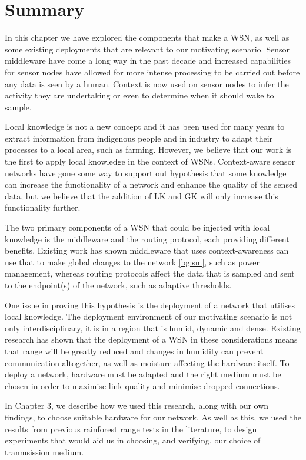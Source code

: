 
\section{Summary}
	In this chapter we have explored the components that make a WSN, as well as some existing deployments that are relevant to our motivating scenario. Sensor middleware have come a long way in the past decade and increased capabilities for sensor nodes have allowed for more intense processing to be carried out before any data is seen by a human. Context is now used on sensor nodes to infer the activity they are undertaking or even to determine when it should wake to sample. 

Local knowledge is not a new concept and it has been used for many years to extract information from indigenous people and in industry to adapt their processes to a local area, such as farming. However, we believe that our work is the first to apply local knowledge in the context of WSNs. Context-aware sensor networks have gone some way to support out hypothesis that some knowledge can increase the functionality of a network and enhance the quality of the sensed data, but we believe that the addition of LK and GK will only increase this functionality further.

The two primary components of a WSN that could be injected with local knowledge is the middleware and the routing protocol, each providing different benefits. Existing work has shown middleware that uses context-awareness can use that to make global changes to the network \ref{bg:sm}, such as power management, whereas routing protocols affect the data that is sampled and sent to the endpoint(s) of the network, such as adaptive thresholds.

One issue in proving this hypothesis is the deployment of a network that utilises local knowledge. The deployment environment of our motivating scenario is not only interdisciplinary, it is in a region that is humid, dynamic and dense. Existing research has shown that the deployment of a WSN in these considerations means that range will be greatly reduced \cite{Figueiredo2009} and changes in humidity can prevent communication altogether, as well as moisture affecting the hardware itself.
To deploy a network, hardware must be adapted and the right medium must be chosen in order to maximise link quality and minimise dropped connections.

In Chapter 3, we describe how we used this research, along with our own findings, to choose suitable hardware for our network. As well as this, we used the results from previous rainforest range tests in the literature, to design  experiments that would aid us in choosing, and verifying, our choice of tranmsission medium.

